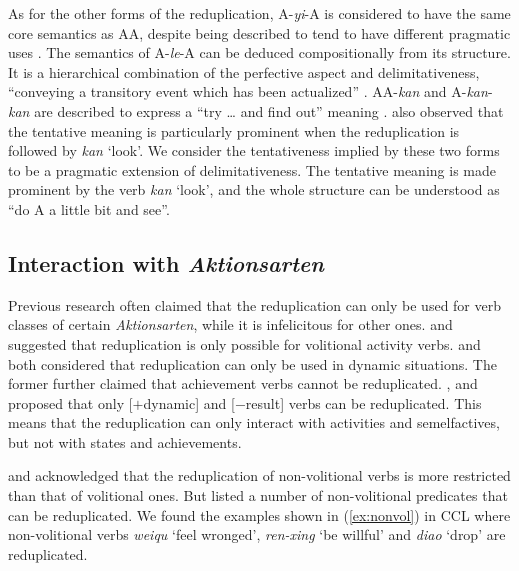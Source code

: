 \documentclass[11pt,a4paper,fleqn,draft]{article}
\begin{document}
As for the other forms of the reduplication, 
A-\emph{yi}-A is considered to have the same core semantics as AA,
despite being described to tend to have different pragmatic uses \citep{Yang2003}. 
The semantics of A-\emph{le}-A can be deduced compositionally from its structure. 
It is a hierarchical combination of the perfective aspect and delimitativeness, ``conveying a transitory event which has been actualized'' \citep[151]{XiaoMcEnery2004}.
AA-\emph{kan} and A-\emph{kan}-\emph{kan} are described to express a ``try \ldots{} and find out'' meaning \citep[63]{Cheng2012}.
\citet[290]{Tsao2001} also observed that the tentative meaning is particularly prominent when the reduplication is followed by \emph{kan} `look'.
We consider the tentativeness implied by these two forms to be a pragmatic extension of delimitativeness.
The tentative meaning is made prominent by the verb \emph{kan} `look',
and the whole structure can be understood as ``do A a little bit and see''.




\subsection{Interaction with \emph{Aktionsarten}}\label{sec:Aktionsarten}

Previous research often claimed that the reduplication can only be used for verb classes of certain \emph{Aktionsarten}, while it is infelicitous for other ones.
\citet[277--278]{Hong1999} and \citet[234--235]{LiThompson1981} suggested that reduplication is only possible for volitional activity verbs.
\citet[70--71]{Dai1997} and \citet[290]{Tsao2001} both considered that reduplication can only be used in dynamic situations.
The former further claimed that achievement verbs cannot be reduplicated.
\citet[20]{Arcodiaetal2014}, \citet{BascianoMelloni2017} and \citet[155]{XiaoMcEnery2004} proposed that only [$+$dynamic] and [$-$result] verbs can be reduplicated.
This means that the reduplication can only interact with activities and semelfactives, but not with states and achievements.

\citet[53]{Chen2001} and \citet[10--11]{Yang2003} acknowledged that the reduplication of non\hyp{}volitional verbs is more restricted than that of volitional ones.
But \citet[381--382]{Zhu1998} listed a number of non\hyp{}volitional predicates that can be reduplicated.
We found the examples shown in (\ref{ex:nonvol}) in CCL where non\hyp{}volitional verbs \emph{weiqu} `feel wronged', \emph{ren-xing} `be willful' and \emph{diao} `drop' are reduplicated.
\end{document}
